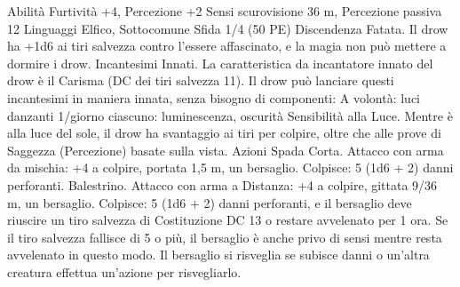 \begin{multicols}{2}
Abilità Furtività +4, Percezione +2
Sensi scurovisione 36 m, Percezione passiva 12
Linguaggi Elfico, Sottocomune
Sfida 1/4 (50 PE)
Discendenza Fatata. Il drow ha +1d6 ai tiri salvezza contro
l’essere affascinato, e la magia non può mettere a dormire i
drow.
Incantesimi Innati. La caratteristica da incantatore innato del
drow è il Carisma (DC dei tiri salvezza 11). Il drow può lanciare
questi incantesimi in maniera innata, senza bisogno di
componenti:
A volontà: luci danzanti
1/giorno ciascuno: luminescenza, oscurità
Sensibilità alla Luce. Mentre è alla luce del sole, il drow ha
svantaggio ai tiri per colpire, oltre che alle prove di Saggezza
(Percezione) basate sulla vista.
Azioni
Spada Corta. Attacco con arma da mischia: +4 a colpire, portata
1,5 m, un bersaglio.
Colpisce: 5 (1d6 + 2) danni perforanti.
Balestrino. Attacco con arma a Distanza: +4 a colpire, gittata
9/36 m, un bersaglio.
Colpisce: 5 (1d6 + 2) danni perforanti, e il bersaglio deve
riuscire un tiro salvezza di Costituzione DC 13 o restare
avvelenato per 1 ora. Se il tiro salvezza fallisce di 5 o più, il
bersaglio è anche privo di sensi mentre resta avvelenato in questo
modo. Il bersaglio si risveglia se subisce danni o un’altra
creatura effettua un’azione per risvegliarlo.
 

\end{multicols}
